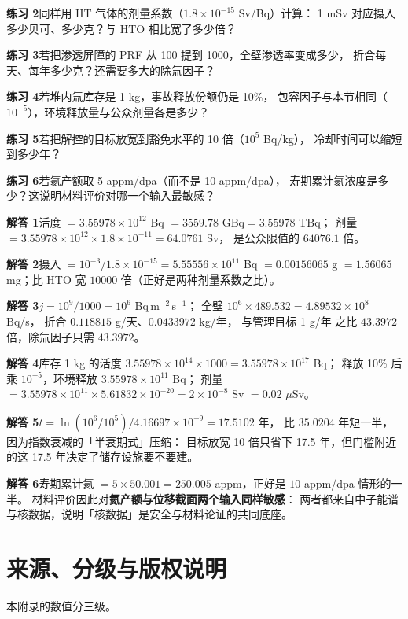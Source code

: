 \textbf{练习 2}同样用 HT 气体的剂量系数（$1.8\times10^{-15}$ Sv/Bq）计算：
1 mSv 对应摄入多少贝可、多少克？与 HTO 相比宽了多少倍？

\textbf{练习 3}若把渗透屏障的 PRF 从 100 提到 1000，全壁渗透率变成多少，
折合每天、每年多少克？还需要多大的除氚因子？

\textbf{练习 4}若堆内氚库存是 1 kg，事故释放份额仍是 10\%，
包容因子与本节相同（$10^{-5}$），环境释放量与公众剂量各是多少？

\textbf{练习 5}若把解控的目标放宽到豁免水平的 10 倍（$10^{5}$ Bq/kg），
冷却时间可以缩短到多少年？

\textbf{练习 6}若氦产额取 5 appm/dpa（而不是 10 appm/dpa），
寿期累计氦浓度是多少？这说明材料评价对哪一个输入最敏感？

\textbf{解答 1}活度 $=3.55978\times10^{12}$ Bq $=3559.78$ GBq$=3.55978$ TBq；
剂量 $=3.55978\times10^{12}\times1.8\times10^{-11}=64.0761$ Sv，
是公众限值的 $64076.1$ 倍。

\textbf{解答 2}摄入 $=10^{-3}/1.8\times10^{-15}=5.55556\times10^{11}$ Bq
$=0.00156065$ g $=1.56065$ mg；比 HTO 宽 $10000$ 倍（正好是两种剂量系数之比）。

\textbf{解答 3}$j=10^{9}/1000=10^{6}$ Bq\,m$^{-2}$\,s$^{-1}$；
全壁 $10^{6}\times489.532=4.89532\times10^{8}$ Bq/s，
折合 $0.118815$ g/天、$0.0433972$ kg/年，
与管理目标 1 g/年 之比 $43.3972$ 倍，除氚因子只需 $43.3972$。

\textbf{解答 4}库存 1 kg 的活度 $3.55978\times10^{14}\times1000=3.55978\times10^{17}$ Bq；
释放 10\% 后乘 $10^{-5}$，环境释放 $3.55978\times10^{11}$ Bq；
剂量 $=3.55978\times10^{11}\times5.61832\times10^{-20}=2\times10^{-8}$ Sv $=0.02$ $\mu$Sv。

\textbf{解答 5}$t=\ln(10^{6}/10^{5})/4.16697\times10^{-9}=17.5102$ 年，
比 $35.0204$ 年短一半，因为指数衰减的「半衰期式」压缩：
目标放宽 10 倍只省下 17.5 年，但门槛附近的这 17.5 年决定了储存设施要不要建。

\textbf{解答 6}寿期累计氦 $=5\times50.001=250.005$ appm，正好是 $10$ appm/dpa 情形的一半。
材料评价因此对\textbf{氦产额与位移截面两个输入同样敏感}：
两者都来自中子能谱与核数据，说明「核数据」是安全与材料论证的共同底座。

\section{来源、分级与版权说明}
\label{sec:app-ak-source}

\begingroup\small
本附录的数值分三级。

